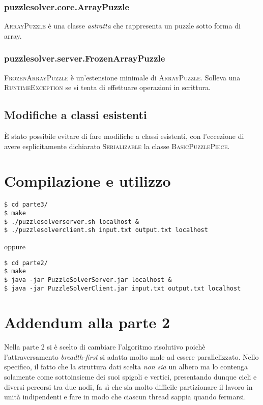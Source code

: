 \documentclass[a4paper]{article}
\newcommand{\Classname}[1]{\textsc{#1}}
\newcommand{\Ifacename}[1]{\textsc{#1}}
\begin{document}
\subsubsection{puzzlesolver.core.ArrayPuzzle}
\Classname{ArrayPuzzle} \`e una classe \emph{astratta} che rappresenta un puzzle sotto forma di array.
\subsubsection{puzzlesolver.server.FrozenArrayPuzzle}
\Classname{FrozenArrayPuzzle} \`e un'estensione minimale di \Classname{ArrayPuzzle}.
Solleva una \Classname{RuntimeException} se si tenta di effettuare operazioni in scrittura.

\subsection{Modifiche a classi esistenti}
\`E stato possibile evitare di fare modifiche a classi esistenti, con l'eccezione di avere esplicitamente dichiarato \Ifacename{Serializable} la classe \Classname{BasicPuzzlePiece}.

\section{Compilazione e utilizzo}
\begin{verbatim}
$ cd parte3/ 
$ make
$ ./puzzlesolverserver.sh localhost &
$ ./puzzlesolverclient.sh input.txt output.txt localhost
\end{verbatim}
oppure
\begin{verbatim}
$ cd parte2/ 
$ make
$ java -jar PuzzleSolverServer.jar localhost &
$ java -jar PuzzleSolverClient.jar input.txt output.txt localhost
\end{verbatim}

% 
\appendix
\section{Addendum alla parte 2}
Nella parte 2 si \`e scelto di cambiare l'algoritmo risolutivo poich\`e l'attraversamento \emph{breadth-first} si adatta molto male ad essere parallelizzato.
Nello specifico, il fatto che la struttura dati scelta \emph{non sia} un albero ma lo contenga solamente come sottoinsieme dei suoi spigoli e vertici, presentando dunque cicli e diversi percorsi tra due nodi, fa s\`i che sia molto difficile partizionare il lavoro in unit\`a indipendenti e fare in modo che ciascun thread sappia quando fermarsi.
\end{document}
